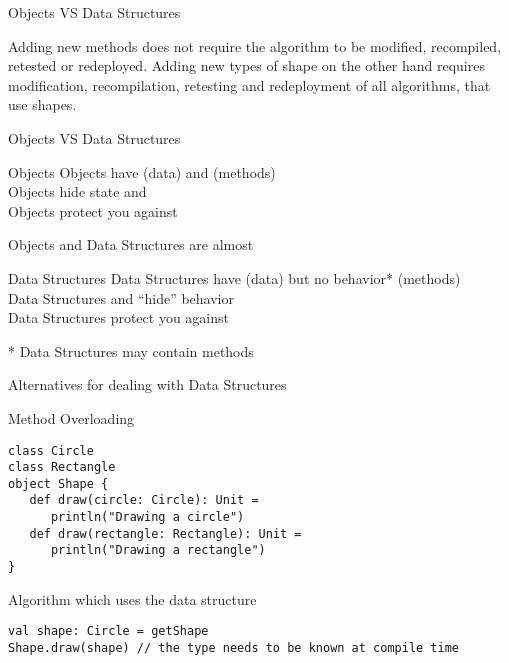 \begin{frame}[fragile]{Objects VS Data Structures}
\begin{center}
Adding new methods does not require the algorithm to be modified, recompiled,
retested or redeployed. Adding new types of shape on the other
hand requires modification, recompilation, retesting and redeployment of
\alert{all} algorithms, that use shapes.
\end{center}
\end{frame}

\begin{frame}{Objects VS Data Structures}
\begin{block}{Objects}
Objects have  (data) and  (methods)\\
Objects \alert{hide state} and \\
Objects protect you against \\
\end{block}
\begin{center}
Objects and Data Structures are almost 
\end{center}
\begin{block}{Data Structures}
Data Structures have  (data) but \alert{no behavior}* (methods)\\
Data Structures  and \alert{``hide'' behavior}\\
Data Structures protect you against \\
\end{block}
* Data Structures may contain  methods
\end{frame}

\begin{frame}[fragile]{Alternatives for dealing with Data Structures}
\begin{block}{Method Overloading}
\begin{lstlisting}
class Circle
class Rectangle
object Shape {
   def draw(circle: Circle): Unit =
      println("Drawing a circle")
   def draw(rectangle: Rectangle): Unit =
      println("Drawing a rectangle")
}
\end{lstlisting}
\end{block}
\pause
\begin{alertblock}{Algorithm which uses the data structure}
\begin{lstlisting}
val shape: Circle = getShape
Shape.draw(shape) // the type needs to be known at compile time
\end{lstlisting}
\end{alertblock}
\end{frame}

